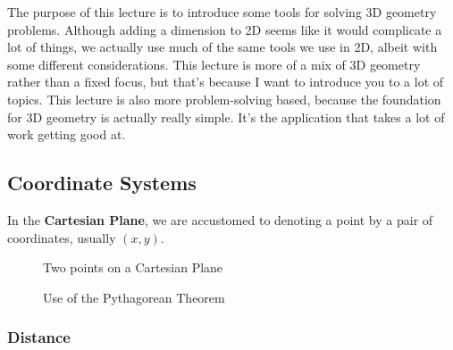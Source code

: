 The purpose of this lecture is to introduce some tools for solving 3D geometry problems. Although adding a dimension to 2D seems like it would complicate a lot of things, we actually use much of the same tools we use in 2D, albeit with some different considerations. This lecture is more of a mix of 3D geometry rather than a fixed focus, but that's because I want to introduce you to a lot of topics. This lecture is also more problem-solving based, because the foundation for 3D geometry is actually really simple. It's the application that takes a lot of work getting good at.

\subsection{Coordinate Systems}

In the \textbf{Cartesian Plane}, we are accustomed to denoting a point by a pair of coordinates, usually $(x,y)$.

\begin{figure}[H]
  \centering
  \begin{minipage}[b]{0.4\textwidth}
    \centering
    \caption{Two points on a Cartesian Plane}
  \end{minipage}
  \hfill
  \begin{minipage}[b]{0.4\textwidth}
    \centering
    \caption{Use of the Pythagorean Theorem}
    \label{fig:pyth}
  \end{minipage}
\end{figure}

\subsubsection{Distance}

